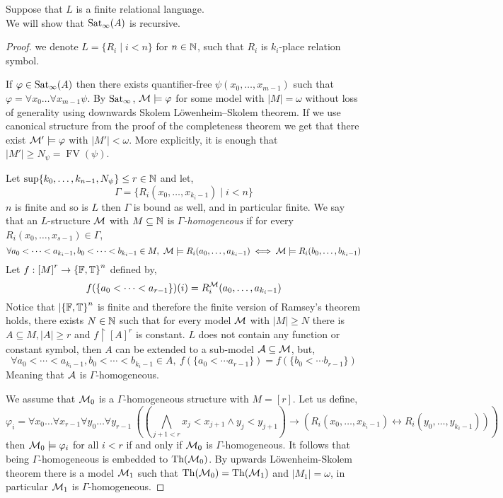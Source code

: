 \question{}
Suppose that $L$ is a finite relational language. \\
We will show that $\operatorname{Sat}_{\infty}(A)$ is recursive.
\begin{proof}
	we denote $L = \{ R_i \mid i < n \}$ for $n \in \mathbb{N}$, such that $R_i$ is $k_i$-place relation symbol.

	If $\varphi \in \operatorname{Sat}_{\infty}(A)$ then there exists quantifier-free $\psi(x_0, \ldots, x_{m - 1})$ such that $\varphi = \forall x_0 \ldots \forall x_{m - 1} \psi$.
	By $\operatorname{Sat}_{\infty}$, $\mathcal{M} \models \varphi$ for some model with $|M| = \omega$ without loss of generality using downwards Skolem Löwenheim–Skolem theorem.
	If we use canonical structure from the proof of the completeness theorem we get that there exist $\mathcal{M}' \models \varphi$ with $|M'| < \omega$.
	More explicitly, it is enough that $|M'| \ge N_{\psi} = \operatorname{FV}(\psi)$.

	Let $\sup \{ k_0, \ldots, k_{n - 1}, N_{\psi} \} \le r \in \mathbb{N}$ and let,
	\[
		\Gamma
		= \{ R_i(x_0, \ldots, x_{k_i - 1}) \mid i < n \}
	\]
	$n$ is finite and so is $L$ then $\Gamma$ is bound as well, and in particular finite.
	We say that an $L$-structure $\mathcal{M}$ with $M \subseteq \mathbb{N}$ is \textit{$\Gamma$-homogeneous} if for every $R_i(x_0, \ldots, x_{s - 1}) \in \Gamma$,
	\[
		\forall a_0 < \cdots < a_{k_i - 1}, b_0 < \cdots < b_{k_i - 1} \in M,\ 
		\Mm \models R_i(a_0, \ldots, a_{k_i - 1})
		\iff \Mm \models R_i(b_0, \ldots, b_{k_i - 1})
	\]
	Let $f : {[ M ]}^r \to {\{ \mathbb{F}, \mathbb{T}\}}^n$ defined by,
	\[
		f(\{ a_0 < \cdots < a_{r - 1} \})(i)
		= R_i^{\mathcal{M}}(a_0, \ldots, a_{k_i - 1})
	\]
	Notice that $|{\{ \mathbb{F}, \mathbb{T} \}}^n$ is finite and therefore the finite version of Ramsey's theorem holds,
	there exists $N \in \mathbb{N}$ such that for every model $\mathcal{M}$ with $|M| \ge N$ there is $A \subseteq M, |A| \ge r$ and $f \restriction {[ A ]}^r$ is constant.
	$L$ does not contain any function or constant symbol, then $A$ can be extended to a sub-model $\mathcal{A} \subseteq \mathcal{M}$, but,
	\[
		\forall a_0 < \cdots < a_{k_i - 1}, b_0 < \cdots < b_{k_i - 1} \in A,\ 
		f(\{ a_0 < \cdots a_{r - 1} \})
		= f(\{ b_0 < \cdots b_{r - 1} \})
	\]
	Meaning that $\mathcal{A}$ is $\Gamma$-homogeneous.

	We assume that $\mathcal{M}_0$ is a $\Gamma$-homogeneous structure with $M = [r]$.
	Let us define,
	\[
		\varphi_i
		= \forall x_0 \ldots \forall x_{r - 1} \forall y_0 \ldots \forall y_{r - 1}\ 
		\left(\left(\bigwedge_{j + 1 < r} x_j < x_{j + 1} \land y_j < y_{j + 1}\right) \to (R_i(x_0, \ldots, x_{k_i - 1}) \leftrightarrow R_i(y_0, \ldots, y_{k_i - 1}))\right)
	\]
	then $\mathcal{M}_0 \models \varphi_i$ for all $i < r$ if and only if $\mathcal{M}_0$ is $\Gamma$-homogeneous.
	It follows that being $\Gamma$-homogeneous is embedded to $\operatorname{Th}(\mathcal{M}_0)$.
	By upwards Löwenheim-Skolem theorem there is a model $\mathcal{M}_1$ such that $\operatorname{Th}(\mathcal{M}_0) = \operatorname{Th}(\mathcal{M}_1)$ and $|M_1| = \omega$, in particular $\mathcal{M}_1$ is $\Gamma$-homogeneous.


\end{proof}

